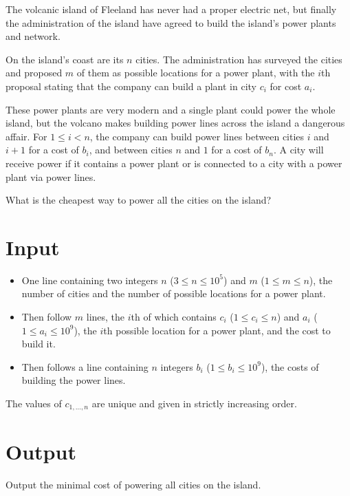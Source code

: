 

\providecommand\maxn{}\renewcommand{\maxn}{10^5}
\providecommand\maxc{}\renewcommand{\maxc}{10^9}

The volcanic island of Fleeland has never had a proper electric net, but finally the administration of the island
have agreed to build the island's power plants and network.

On the island's coast are its $n$ cities. The administration has surveyed the cities and proposed $m$ of them as possible
locations for a power plant, with the $i$th proposal stating that the company can build a plant in city $c_i$ for
cost $a_i$.

These power plants are very modern and a single plant could power the whole island, but the volcano makes building
power lines across the island a dangerous affair. For $1 \leq i < n$, the company can build power lines between
cities $i$ and $i+1$ for a cost of $b_i$, and between cities $n$ and $1$ for a cost of $b_n$.
A city will receive power if it contains a power plant or is connected to a city with a power plant via power
lines.

What is the cheapest way to power all the cities on the island?

\section*{Input}
	\begin{itemize}
		\item One line containing two integers $n$ ($3\leq n \leq \maxn$) and $m$ ($1\leq m \leq n$), the
			number of cities and the number of possible locations for a power plant.
		\item Then follow $m$ lines, the $i$th of which contains $c_i$ ($1 \leq c_i \leq n$) and $a_i$ ($1
			\leq a_i \leq \maxc$), the $i$th possible location for a power plant, and the cost to build it.

		\item Then follows a line containing $n$ integers $b_i$ ($1 \leq b_i \leq \maxc$), the costs of
			building the power lines.
	\end{itemize}
  The values of $c_{1,\ldots,n}$ are unique and given in strictly increasing order.

\section*{Output}
	Output the minimal cost of powering all cities on the island.

